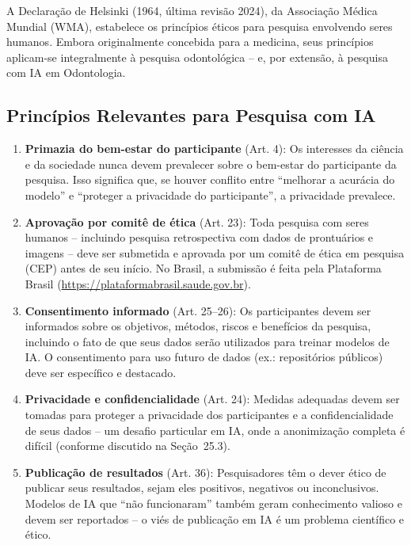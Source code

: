 \nivelquatro

A Declaração de Helsinki (1964, última revisão 2024), da Associação Médica
Mundial (WMA), estabelece os princípios éticos para pesquisa envolvendo seres
humanos. Embora originalmente concebida para a medicina, seus princípios
aplicam-se integralmente à pesquisa odontológica -- e, por extensão, à pesquisa
com IA em Odontologia.


\subsection{Princípios Relevantes para Pesquisa com IA}

\begin{enumerate}
  \item \textbf{Primazia do bem-estar do participante} (Art. 4): Os interesses
    da ciência e da sociedade nunca devem prevalecer sobre o bem-estar do
    participante da pesquisa. Isso significa que, se houver conflito entre
    ``melhorar a acurácia do modelo'' e ``proteger a privacidade do
    participante'', a privacidade prevalece.

  \item \textbf{Aprovação por comitê de ética} (Art. 23): Toda pesquisa com
    seres humanos -- incluindo pesquisa retrospectiva com dados de prontuários
    e imagens -- deve ser submetida e aprovada por um comitê de ética em
    pesquisa (CEP) antes de seu início. No Brasil, a submissão é feita pela
    Plataforma Brasil (\url{https://plataformabrasil.saude.gov.br}).

  \item \textbf{Consentimento informado} (Art. 25--26): Os participantes devem
    ser informados sobre os objetivos, métodos, riscos e benefícios da pesquisa,
    incluindo o fato de que seus dados serão utilizados para treinar modelos de
    IA. O consentimento para uso futuro de dados (ex.: repositórios públicos)
    deve ser específico e destacado.

  \item \textbf{Privacidade e confidencialidade} (Art. 24): Medidas adequadas
    devem ser tomadas para proteger a privacidade dos participantes e a
    confidencialidade de seus dados -- um desafio particular em IA, onde a
    anonimização completa é difícil (conforme discutido na Seção~25.3).

  \item \textbf{Publicação de resultados} (Art. 36): Pesquisadores têm o dever
    ético de publicar seus resultados, sejam eles positivos, negativos ou
    inconclusivos. Modelos de IA que ``não funcionaram'' também geram
    conhecimento valioso e devem ser reportados -- o viés de publicação em IA
    é um problema científico e ético.
\end{enumerate}

